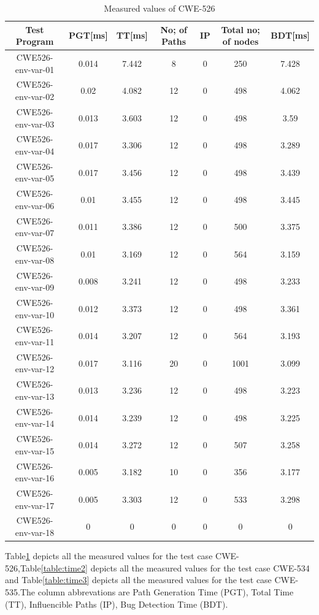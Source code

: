 \begin{table}[h!]
\centering
 \begin{tabular}{||c |c |c |c |c| c|c||} 
 \hline
 \textbf{Test Program} & \textbf{PGT[ms]} & \textbf{TT[ms]} & \textbf{No; of Paths} & \textbf{IP}& \textbf{Total no; of nodes}&
 \textbf{BDT[ms]}\\ [0.5ex] 
 \hline\hline
 CWE526-env-var-01 & 0.014 & 7.442 & 8 & 0& 250&7.428\\ 
 \hline
CWE526-env-var-02 & 0.02 & 4.082 & 12&0& 498&4.062\\ 
 \hline
 CWE526-env-var-03 & 0.013 & 3.603 & 12&0& 498&3.59\\ 
 \hline
 CWE526-env-var-04 & 0.017 & 3.306 & 12&0& 498&3.289\\ 
 \hline
 CWE526-env-var-05 & 0.017 & 3.456 & 12&0& 498&3.439\\ 
 \hline
 CWE526-env-var-06 & 0.01 & 3.455 & 12&0& 498&3.445\\ 
 \hline
 CWE526-env-var-07 & 0.011 & 3.386 & 12&0& 500&3.375\\ 
 \hline
 CWE526-env-var-08 & 0.01 & 3.169 & 12&0& 564&3.159\\ 
 \hline
 CWE526-env-var-09 & 0.008 & 3.241 & 12&0& 498&3.233\\ 
 \hline
 CWE526-env-var-10 & 0.012 & 3.373 & 12&0&498&3.361 \\ 
 \hline
 CWE526-env-var-11 & 0.014 & 3.207 & 12&0&564&3.193 \\ 
 \hline
 CWE526-env-var-12 & 0.017 & 3.116 &20&0& 1001&3.099\\ 
 \hline
 CWE526-env-var-13 & 0.013 & 3.236 & 12&0& 498&3.223\\ 
 \hline
 CWE526-env-var-14 & 0.014 & 3.239 & 12&0& 498&3.225\\ 
 \hline
 CWE526-env-var-15 & 0.014 & 3.272 & 12&0&507&3.258\\ 
 \hline
  CWE526-env-var-16 & 0.005 & 3.182 & 10&0& 356&3.177\\ 
 \hline
  CWE526-env-var-17 & 0.005 & 3.303 & 12&0& 533&3.298\\ 
 \hline
  CWE526-env-var-18 & 0 & 0 & 0&0& 0&0\\ 
 \hline
 \hline
\end{tabular}
\caption{Measured values of CWE-526}
\label{table:time1}
\end{table}

Table\ref{table:time1} depicts all the measured values for the test case 
CWE-526,Table\ref{table:time2} 
depicts all the measured values for the test case CWE-534 and
Table\ref{table:time3} depicts all the measured values for the test case CWE-535.The column
abbrevations are Path Generation Time (PGT), Total Time (TT), Influencible Paths (IP),
Bug Detection Time (BDT).

